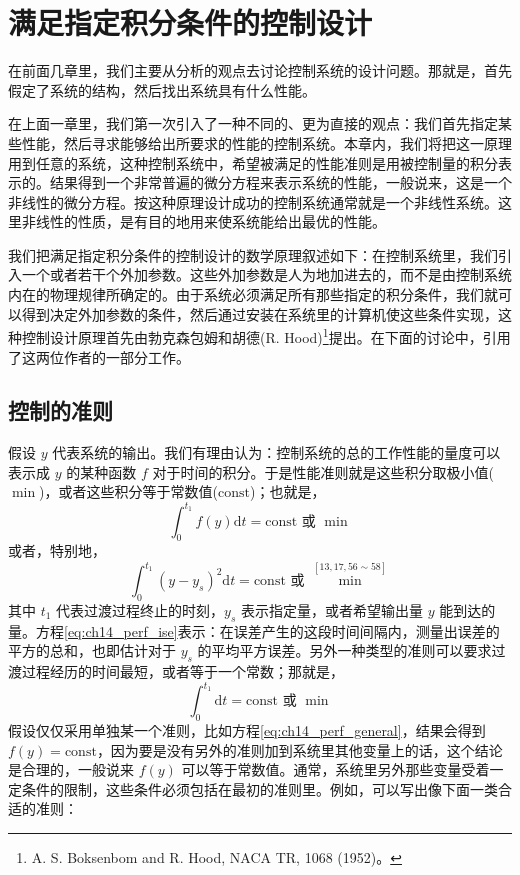 
\chapter{满足指定积分条件的控制设计}\label{chapter_14}

在前面几章里，我们主要从分析的观点去讨论控制系统的设计问题。那就是，首先假定了系统的结构，然后找出系统具有什么性能。

在上面一章里，我们第一次引入了一种不同的、更为直接的观点：我们首先指定某些性能，然后寻求能够给出所要求的性能的控制系统。本章内，我们将把这一原理用到任意的系统，这种控制系统中，希望被满足的性能准则是用被控制量的积分表示的。结果得到一个非常普遍的微分方程来表示系统的性能，一般说来，这是一个非线性的微分方程。按这种原理设计成功的控制系统通常就是一个非线性系统。这里非线性的性质，是有目的地用来使系统能给出最优的性能。

我们把满足指定积分条件的控制设计的数学原理叙述如下：在控制系统里，我们引入一个或者若干个外加参数。这些外加参数是人为地加进去的，而不是由控制系统内在的物理规律所确定的。由于系统必须满足所有那些指定的积分条件，我们就可以得到决定外加参数的条件，然后通过安装在系统里的计算机使这些条件实现，这种控制设计原理首先由勃克森包姆和胡德(R. Hood)\footnote{A. S. Boksenbom and R. Hood, NACA TR, 1068 (1952)。}提出。在下面的讨论中，引用了这两位作者的一部分工作。

\section{控制的准则}

假设 $y$ 代表系统的输出。我们有理由认为：控制系统的总的工作性能的量度可以表示成 $y$ 的某种函数 $f$ 对于时间的积分。于是性能准则就是这些积分取极小值($\min$)，或者这些积分等于常数值($\mathrm{const}$)；也就是，
\begin{equation}
\int_{0}^{t_1} f(y) \mathrm{d}t = \mathrm{const} \text{ 或 } \min
\label{eq:ch14_perf_general}
\end{equation}
或者，特别地，
\begin{equation}
\int_{0}^{t_1} (y - y_s)^2 \mathrm{d}t = \mathrm{const} \text{ 或 } \min ^{[13,17,56\sim58]}
\label{eq:ch14_perf_ise}
\end{equation}
其中 $t_1$ 代表过渡过程终止的时刻，$y_s$ 表示指定量，或者希望输出量 $y$ 能到达的量。方程\eqref{eq:ch14_perf_ise}表示：在误差产生的这段时间间隔内，测量出误差的平方的总和，也即估计对于 $y_s$ 的平均平方误差。另外一种类型的准则可以要求过渡过程经历的时间最短，或者等于一个常数；那就是，
\begin{equation}
\int_{0}^{t_1} \mathrm{d}t = \mathrm{const} \text{ 或 } \min
\label{eq:ch14_perf_time}
\end{equation}
假设仅仅采用单独某一个准则，比如方程\eqref{eq:ch14_perf_general}，结果会得到 $f(y)=\mathrm{const}$，因为要是没有另外的准则加到系统里其他变量上的话，这个结论是合理的，一般说来 $f(y)$ 可以等于常数值。通常，系统里另外那些变量受着一定条件的限制，这些条件必须包括在最初的准则里。例如，可以写出像下面一类合适的准则：

